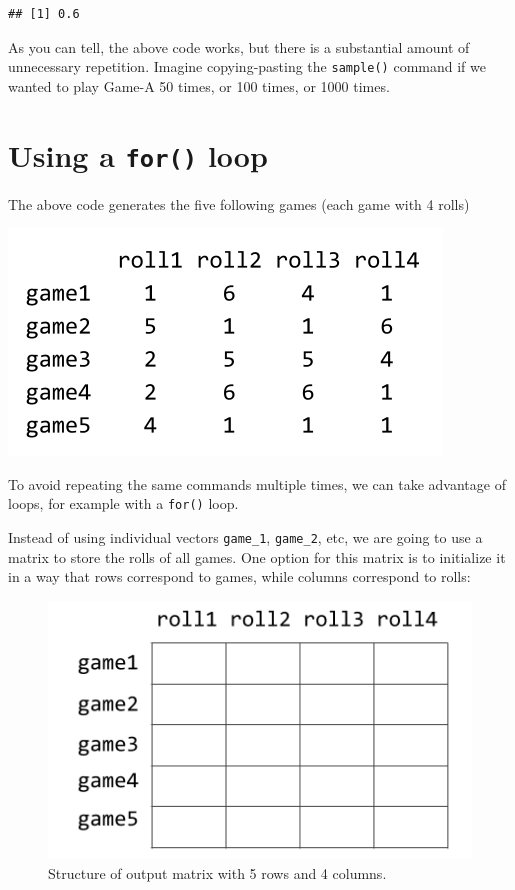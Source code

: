 \documentclass[
]{book}
\begin{document}
\begin{verbatim}
## [1] 0.6
\end{verbatim}

As you can tell, the above code works, but there is a substantial amount of
unnecessary repetition. Imagine copying-pasting the \texttt{sample()} command
if we wanted to play Game-A 50 times, or 100 times, or 1000 times.

\hypertarget{using-a-for-loop}{%
\section{\texorpdfstring{Using a \texttt{for()} loop}{Using a for() loop}}\label{using-a-for-loop}}

The above code generates the five following games (each game with 4 rolls)

\begin{center}\includegraphics[width=0.4\linewidth]{images/demere-5-games} \end{center}

To avoid repeating the same commands multiple times, we can take advantage of
loops, for example with a \texttt{for()} loop.

Instead of using individual vectors \texttt{game\_1}, \texttt{game\_2}, etc, we are going to
use a matrix to store the rolls of all games. One option for this matrix is to
initialize it in a way that rows correspond to games, while columns correspond
to rolls:

\begin{figure}

{\centering \includegraphics[width=0.4\linewidth]{images/demere-5-games-matrix} 

}

\caption{Structure of output matrix with 5 rows and 4 columns.}\label{fig:unnamed-chunk-23}
\end{figure}
\end{document}

